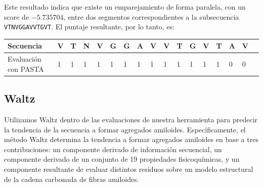 Este resultado indica que existe un emparejamiento de forma paralela, con un score de $-5.735704$, entre dos segmentos correspondientes a la subsecuencia \texttt{VTNVGGAVVTGVT}. 
El puntaje resultante, por lo tanto, es:

\begin{center}
\begin{tabular}{lllllllllllllllll} 
\hline    
Secuencia & \textbf{V} & \textbf{T} & \textbf{N} & \textbf{V} & \textbf{G} & \textbf{G} & \textbf{A} & \textbf{V} & \textbf{V} &\textbf{T} & \textbf{G} & \textbf{V} & \textbf{T} & \textbf{A} & \textbf{V} \\ \hline
Evaluación con PASTA & 1 & 1 & 1 & 1 & 1 & 1 & 1 & 1 & 1 & 1 & 1 & 1 & 1 & 0 & 0 \\ \hline
\end{tabular}
\end{center}

















\subsection{Waltz}\label{waltz}

Utilizamos Waltz \cite{maurer2010exploring} dentro de las evaluaciones de nuestra herramienta para predecir la tendencia de la secuencia a formar agregados amiloides.
Específicamente, el método Waltz determina la tendencia a formar agregados amiloides en base a 
tres contribuciones: un componente derivado de información secuencial, un componente derivado de un conjunto de 19 propiedades fisicoquímicas, 
y un componente resultante de evaluar distintos residuos sobre un modelo estructural de la cadena carbonada de fibras amiloides.

